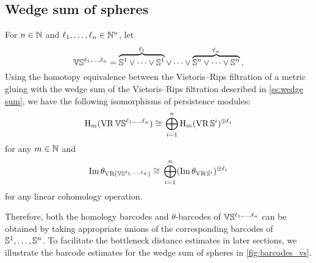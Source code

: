 % 	

\subsection{Wedge sum of spheres}


For $n \in \mathbb{N}$ and $\ell_1, \dots, \ell_n \in \mathbb{N}^n$, let
\[
\mathbb{V}\mathbb{S}^{\ell_1,\dots,\ell_n} =
\overbrace{\mathbb{S}^1\vee\dots\vee\mathbb{S}^1}^{\ell_1} \vee\dots\vee \overbrace{\mathbb{S}^n\vee\dots\vee\mathbb{S}^n}^{\ell_n}.
\]
Using the homotopy equivalence between the Vietoris--Rips filtration of a metric gluing with the wedge sum of the Vietoris--Rips filtration described in \cref{ss:wedge sum}, we have the following isomorphisms of persistence modules:
\[
\mathrm{H}_m (\operatorname{VR}\mathbb{V}\mathbb{S}^{\ell_1,\dots,\ell_n}) \cong \, \bigoplus_{i=1}^n \mathrm{H}_m (\operatorname{VR}\mathbb{S}^i)^{\oplus \ell_i}
\]
for any \(m \in \mathbb{N}\) and
\[
\operatorname{Im}\theta_{\operatorname{VR}(\mathbb{V}\mathbb{S}^{\ell_1,\dots,\ell_n})} \cong \, \bigoplus_{i=1}^n (\operatorname{Im}\theta_{\operatorname{VR}\mathbb{S}^i})^{\oplus \ell_i}
\]
for any linear cohomology operation.

Therefore, both the homology barcodes and \(\theta\)-barcodes of \(\mathbb{V}\mathbb{S}^{\ell_1, \dots, \ell_n}\) can be obtained by taking appropriate unions of the corresponding barcodes of \(\mathbb{S}^1, \dots, \mathbb{S}^n\). 
To facilitate the bottleneck distance estimates in later sections, we illustrate the barcode estimates for the wedge sum of spheres in \cref{fig:barcodes_vs}.



